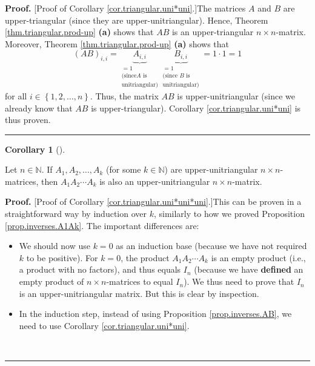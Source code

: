 \documentclass[numbers=enddot,12pt,final,onecolumn,notitlepage]{scrartcl}%
\theoremstyle{definition}
\newtheorem{coro}[theo]{Corollary}
\newenvironment{corollary}[1][]
{\begin{coro}[#1]\begin{leftbar}}
{\end{leftbar}\end{coro}}
\newenvironment{proof}[1][Proof]{\noindent\textbf{#1.} }{\ \rule{0.5em}{0.5em}}
\begin{document}
\begin{proof}
[Proof of Corollary \ref{cor.triangular.uni*uni}.]The matrices $A$ and $B$ are
upper-triangular (since they are upper-unitriangular). Hence, Theorem
\ref{thm.triangular.prod-up} \textbf{(a)} shows that $AB$ is an
upper-triangular $n\times n$-matrix. Moreover, Theorem
\ref{thm.triangular.prod-up} \textbf{(a)} shows that
\[
\left(  AB\right)  _{i,i}=\underbrace{A_{i,i}}_{\substack{=1\\\text{(since
}A\text{ is}\\\text{unitriangular)}}}\underbrace{B_{i,i}}%
_{\substack{=1\\\text{(since }B\text{ is}\\\text{unitriangular)}}}=1\cdot1=1
\]
for all $i\in\left\{  1,2,\ldots,n\right\}  $. Thus, the matrix $AB$ is
upper-unitriangular (since we already know that $AB$ is upper-triangular).
Corollary \ref{cor.triangular.uni*uni} is thus proven.
\end{proof}

\begin{corollary}
\label{cor.triangular.uni*uni*uni}Let $n\in\mathbb{N}$. If $A_{1},A_{2}%
,\ldots,A_{k}$ (for some $k\in\mathbb{N}$) are upper-unitriangular $n\times
n$-matrices, then $A_{1}A_{2}\cdots A_{k}$ is also an upper-unitriangular
$n\times n$-matrix.
\end{corollary}

\begin{proof}
[Proof of Corollary \ref{cor.triangular.uni*uni*uni}.]This can be proven in a
straightforward way by induction over $k$, similarly to how we proved
Proposition \ref{prop.inverses.A1Ak}. The important differences are:

\begin{itemize}
\item We should now use $k=0$ as an induction base (because we have not
required $k$ to be positive). For $k=0$, the product $A_{1}A_{2}\cdots A_{k}$
is an empty product (i.e., a product with no factors), and thus equals $I_{n}$
(because we have \textbf{defined} an empty product of $n\times n$-matrices to
equal $I_{n}$). We thus need to prove that $I_{n}$ is an upper-unitriangular
matrix. But this is clear by inspection.

\item In the induction step, instead of using Proposition
\ref{prop.inverses.AB}, we need to use Corollary \ref{cor.triangular.uni*uni}.
\end{itemize}
\end{proof}
\end{document}
